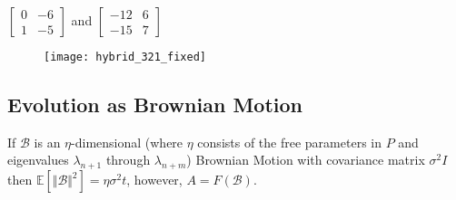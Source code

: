 \documentclass{seminar}
\begin{document}
  \begin{slide}
    $\begin{bmatrix} 0 & -6 \\ 1 & -5 \end{bmatrix}$ and $\begin{bmatrix} -12 & 6 \\ -15 & 7 \end{bmatrix}$
       \begin{figure}
        \texttt{[image: hybrid\_321\_fixed]}
      \end{figure}

  \end{slide}

  \begin{slide}
    \section*{Evolution as Brownian Motion}

    If $\mathcal{B}$ is an $\eta$-dimensional (where $\eta$ consists of the free parameters in $P$ and eigenvalues $\lambda_{n+1}$ through $\lambda_{n+m}$) Brownian Motion with covariance matrix $\sigma^{2} I$ then $\mathbb{E}\left[ \Vert \mathcal{B} \Vert^{2} \right] = \eta \sigma^{2} t$, however, $A = F(\mathcal{B})$. 
  \end{slide}
\end{document}
